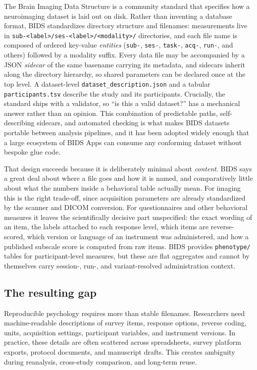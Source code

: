 \documentclass[10pt]{article}
\begin{document}
The Brain Imaging Data Structure \citep{gorgolewski2016bids} is a community
standard that specifies how a neuroimaging dataset is laid out on disk.
Rather than inventing a database format, BIDS standardizes directory
structure and filenames: measurements live in
\texttt{sub-<label>/ses-<label>/<modality>/} directories, and each file name
is composed of ordered key-value \emph{entities}
(\texttt{sub-}, \texttt{ses-}, \texttt{task-}, \texttt{acq-}, \texttt{run-},
and others) followed by a modality suffix. Every data file may be
accompanied by a JSON \emph{sidecar} of the same basename carrying its
metadata, and sidecars inherit along the directory hierarchy, so shared
parameters can be declared once at the top level. A dataset-level
\texttt{dataset\_description.json} and a tabular
\texttt{participants.tsv} describe the study and its participants.
Crucially, the standard ships with a validator, so ``is this a valid
dataset?'' has a mechanical answer rather than an opinion. This combination
of predictable paths, self-describing sidecars, and automated checking is
what makes BIDS datasets portable between analysis pipelines, and it has
been adopted widely enough that a large ecosystem of BIDS Apps can consume
any conforming dataset without bespoke glue code.

That design succeeds because it is deliberately minimal about
\emph{content}. BIDS says a great deal about where a file goes and how it is
named, and comparatively little about what the numbers inside a behavioral
table actually mean. For imaging this is the right trade-off, since
acquisition parameters are already standardized by the scanner and DICOM
conversion. For questionnaires and other behavioral measures it leaves the
scientifically decisive part unspecified: the exact wording of an item, the
labels attached to each response level, which items are reverse-scored,
which version or language of an instrument was administered, and how a
published subscale score is computed from raw items. BIDS provides
\texttt{phenotype/} tables for participant-level measures, but these are
flat aggregates and cannot by themselves carry session-, run-, and
variant-resolved administration context.

\subsection{The resulting gap}

Reproducible psychology requires more than stable filenames. Researchers
need machine-readable descriptions of survey items, response options,
reverse coding, units, acquisition settings, participant variables, and
instrument versions. In practice, these details are often scattered across
spreadsheets, survey platform exports, protocol documents, and manuscript
drafts. This creates ambiguity during reanalysis, cross-study comparison,
and long-term reuse.
\end{document}
